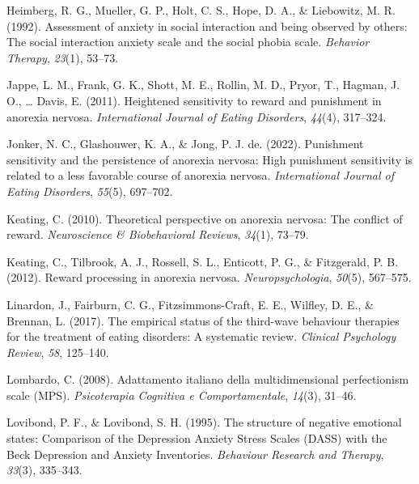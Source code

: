 \documentclass[
  man,floatsintext]{apa6}
\newlength{\cslhangindent}
\newlength{\cslentryspacingunit} %
\newenvironment{CSLReferences}[2] %
 {%
  \setlength{\parindent}{0pt}
  \ifodd #1
  \let\oldpar\par
  \def\par{\hangindent=\cslhangindent\oldpar}
  \fi
  \setlength{\parskip}{#2\cslentryspacingunit}
 }%
 {}
\begin{document}
\begin{CSLReferences}{1}{0}
\leavevmode{}%
Heimberg, R. G., Mueller, G. P., Holt, C. S., Hope, D. A., \& Liebowitz, M. R. (1992). Assessment of anxiety in social interaction and being observed by others: The social interaction anxiety scale and the social phobia scale. \emph{Behavior Therapy}, \emph{23}(1), 53--73.

\leavevmode{}%
Jappe, L. M., Frank, G. K., Shott, M. E., Rollin, M. D., Pryor, T., Hagman, J. O., \ldots{} Davis, E. (2011). Heightened sensitivity to reward and punishment in anorexia nervosa. \emph{International Journal of Eating Disorders}, \emph{44}(4), 317--324.

\leavevmode{}%
Jonker, N. C., Glashouwer, K. A., \& Jong, P. J. de. (2022). Punishment sensitivity and the persistence of anorexia nervosa: High punishment sensitivity is related to a less favorable course of anorexia nervosa. \emph{International Journal of Eating Disorders}, \emph{55}(5), 697--702.

\leavevmode{}%
Keating, C. (2010). Theoretical perspective on anorexia nervosa: The conflict of reward. \emph{Neuroscience \& Biobehavioral Reviews}, \emph{34}(1), 73--79.

\leavevmode{}%
Keating, C., Tilbrook, A. J., Rossell, S. L., Enticott, P. G., \& Fitzgerald, P. B. (2012). Reward processing in anorexia nervosa. \emph{Neuropsychologia}, \emph{50}(5), 567--575.

\leavevmode{}%
Linardon, J., Fairburn, C. G., Fitzsimmons-Craft, E. E., Wilfley, D. E., \& Brennan, L. (2017). The empirical status of the third-wave behaviour therapies for the treatment of eating disorders: A systematic review. \emph{Clinical Psychology Review}, \emph{58}, 125--140.

\leavevmode{}%
Lombardo, C. (2008). Adattamento italiano della multidimensional perfectionism scale (MPS). \emph{Psicoterapia Cognitiva e Comportamentale}, \emph{14}(3), 31--46.

\leavevmode{}%
Lovibond, P. F., \& Lovibond, S. H. (1995). {The structure of negative emotional states: Comparison of the Depression Anxiety Stress Scales (DASS) with the Beck Depression and Anxiety Inventories}. \emph{Behaviour Research and Therapy}, \emph{33}(3), 335--343.


\end{CSLReferences}
\end{document}
